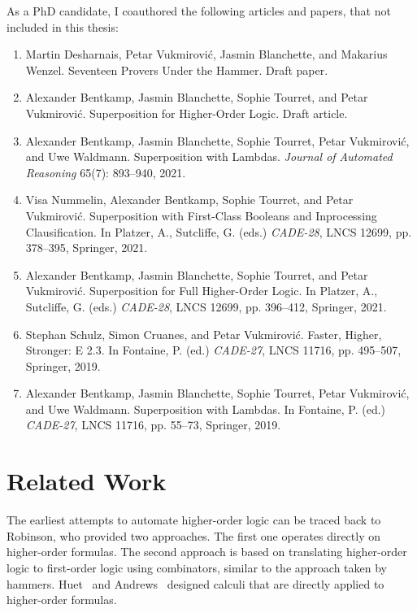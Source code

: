 As a PhD candidate, I coauthored the following articles and papers, that not included in this thesis:

\begin{enumerate}[resume]
  \item Martin Desharnais, Petar Vukmirović, Jasmin Blanchette, and Makarius Wenzel. Seventeen Provers Under the Hammer.
  Draft paper.
  \item Alexander Bentkamp, Jasmin Blanchette, Sophie Tourret, and Petar Vukmirović. Superposition for Higher-Order Logic.
  Draft article.
  \item Alexander Bentkamp, Jasmin Blanchette, Sophie Tourret, Petar Vukmirović, and Uwe Waldmann.  Superposition with Lambdas.
  \emph{Journal of Automated Reasoning} 65(7): 893--940, 2021. 
  \item Visa Nummelin, Alexander Bentkamp, Sophie Tourret, and Petar Vukmirović. Superposition with First-Class Booleans and Inprocessing Clausification.
  In Platzer, A., Sutcliffe, G. (eds.) \emph{CADE-28}, LNCS 12699, pp. 378--395, Springer, 2021.
  \item Alexander Bentkamp, Jasmin Blanchette, Sophie Tourret, and Petar Vukmirović. Superposition for Full Higher-Order Logic.
  In Platzer, A., Sutcliffe, G. (eds.) \emph{CADE-28}, LNCS 12699, pp. 396--412, Springer, 2021.
  \item Stephan Schulz, Simon Cruanes, and Petar Vukmirović. Faster, Higher, Stronger: E 2.3.
  In Fontaine, P. (ed.) \emph{CADE-27},  LNCS 11716, pp. 495--507, Springer, 2019.
  \item Alexander Bentkamp, Jasmin Blanchette, Sophie Tourret, Petar Vukmirović, and Uwe Waldmann.  Superposition with Lambdas.
  In Fontaine, P. (ed.) \emph{CADE-27}, LNCS 11716, pp. 55--73, Springer, 2019. 
\end{enumerate}

\section{Related Work}

The earliest attempts to automate higher-order logic can be traced back to
Robinson, who provided two approaches. The first one \cite{ar-69-hol} operates
directly on higher-order formulas. The second approach \cite{ar-70-hol} is based
on translating higher-order logic to first-order logic using combinators,
similar to the approach taken by hammers. Huet~\cite{gh-73-hol} and
Andrews~\cite{pa-71-type-theory} designed calculi that are directly applied to
higher-order formulas.

